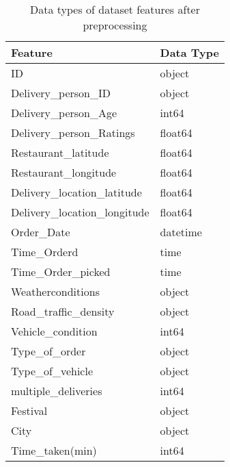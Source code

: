 \documentclass[10pt,twocolumn,letterpaper]{article}
\begin{document}
\begin{table}[ht]
    \centering
    \begin{tabular}{|l|l|}
        \hline
        \textbf{Feature} & \textbf{Data Type} \\ \hline
        ID                                 & object             \\
        Delivery\_person\_ID               & object             \\
        Delivery\_person\_Age              & int64              \\
        Delivery\_person\_Ratings          & float64            \\
        Restaurant\_latitude               & float64            \\
        Restaurant\_longitude              & float64            \\
        Delivery\_location\_latitude       & float64            \\
        Delivery\_location\_longitude      & float64            \\
        Order\_Date                        & datetime           \\
        Time\_Orderd                       & time               \\
        Time\_Order\_picked                & time               \\
        Weatherconditions                  & object             \\
        Road\_traffic\_density             & object             \\
        Vehicle\_condition                 & int64              \\
        Type\_of\_order                    & object             \\
        Type\_of\_vehicle                  & object             \\
        multiple\_deliveries               & int64              \\
        Festival                           & object             \\
        City                               & object             \\
        Time\_taken(min)                   & int64              \\
        \hline
    \end{tabular}
    \caption{Data types of dataset features after preprocessing}
    \label{tab:dataset_dtypes}
\end{table}
\end{document}
